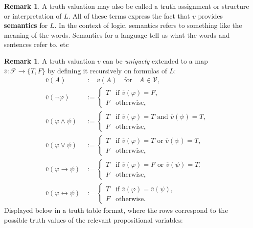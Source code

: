 \documentclass[12pt]{article}
\theoremstyle{definition}
\newtheorem{remark}[theorem]{Remark}
\newcommand{\isp}[1]{\quad\text{#1}\quad}
\renewcommand{\phi}{\varphi}
\newcommand{\<}{\langle}
\renewcommand{\>}{\rangle}
\newcommand{\clo}{\overline}
\newcommand{\FF}{\mathcal{F}}
\newcommand{\VV}{\mathcal{V}}
\newcommand{\keyword}{\textbf}
\newcommand{\liff}{\leftrightarrow}
\begin{document}
\begin{remark}
    A truth valuation may also be called a truth assignment or structure or interpretation of $L$.
    All of these terms express the fact that $v$ provides \keyword{semantics} for $L$.
    In the context of logic, semantics refers to something like the meaning of the words.
    Semantics for a language tell us what the words and sentences refer to.
    etc
\end{remark}

\begin{remark}
    A truth valuation $v$ can be \emph{uniquely} extended to a map $\clo{v} : \FF \to \{T, F\}$ by defining it recursively on formulas of $L$:
    \begin{align*}
        \clo{v}(A) &:= v(A) \isp{for} A \in \VV, \\
        \clo{v}(\lnot \phi) &:= \begin{cases}
            T & \text{if } \clo{v}(\phi) = F, \\
            F & \text{otherwise},
        \end{cases} \\
        \clo{v}(\phi \land \psi) &:= \begin{cases}
            T & \text{if } \clo{v}(\phi) = T \text{ and } \clo{v}(\psi) = T, \\
            F & \text{otherwise},
        \end{cases} \\
        \clo{v}(\phi \lor \psi) &:= \begin{cases}
            T & \text{if } \clo{v}(\phi) = T \text{ or } \clo{v}(\psi) = T, \\
            F & \text{otherwise},
        \end{cases} \\
        \clo{v}(\phi \to \psi) &:= \begin{cases}
            T & \text{if } \clo{v}(\phi) = F \text{ or } \clo{v}(\psi) = T, \\
            F & \text{otherwise},
        \end{cases} \\
        \clo{v}(\phi \liff \psi) &:= \begin{cases}
            T & \text{if } \clo{v}(\phi) = \clo{v}(\psi), \\
            F & \text{otherwise}.
        \end{cases}
    \end{align*}
        Displayed below in a truth table format, where the rows correspond to the possible truth values of the relevant propositional variables:

\end{remark}
\end{document}
